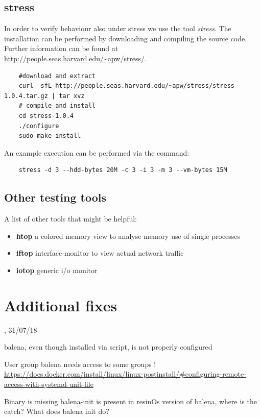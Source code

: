 \documentclass[]{scrartcl}
\begin{document}
\subsection{stress}

In order to verify behaviour also under stress we use the tool \textit{stress}. The installation can be performed by downloading and compiling the source code. Further information can be found at \url{http://people.seas.harvard.edu/~apw/stress/}.

\begin{verbatim}
	#download and extract
	curl -sfL http://people.seas.harvard.edu/~apw/stress/stress-1.0.4.tar.gz | tar xvz
	# compile and install
	cd stress-1.0.4
	./configure
	sudo make install
\end{verbatim}

An example execution can be performed via the command:

\begin{verbatim}
	stress -d 3 --hdd-bytes 20M -c 3 -i 3 -m 3 --vm-bytes 15M
\end{verbatim}

\subsection{Other testing tools}

A list of other tools that might be helpful:

\begin{itemize}
	\item \textbf{htop} a colored memory view to analyse memory use of single processes
	\item \textbf{iftop} interface monitor to view actual network traffic
	\item \textbf{iotop} generic i/o monitor
\end{itemize}

\section{Additional fixes}
{\small\textsc{, 31/07/18} \bigskip}


balena, even though installed via script, is not properly configured

User group balena needs access to some groups !
\url{https://docs.docker.com/install/linux/linux-postinstall/#configuring-remote-access-with-systemd-unit-file}


Binary is missing balena-init
is present in resinOs version of balena, where is the catch?
What does balena init do?
\end{document}

